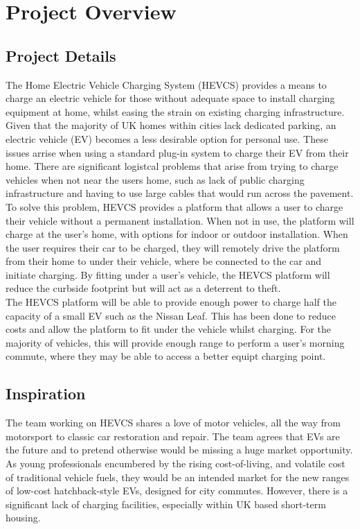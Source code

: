 \documentclass [12pt]{article}
\begin{document}
\section{Project Overview}\label{sec:project_overview}
\subsection{Project Details}\label{sec:project_details}

The Home Electric Vehicle Charging System (HEVCS) provides a means to charge an electric vehicle for those without adequate space to install charging equipment at home, whilst easing the strain on existing charging infrastructure.
Given that the majority of UK homes within cities lack dedicated parking, an electric vehicle (EV) becomes a less desirable option for personal use.
These issues arrise when using a standard plug-in system to charge their EV from their home.
There are significant logistcal problems that arise from trying to charge vehicles when not near the users home, such as lack of public charging infrastructure and having to use large cables that would run across the pavement.
\\
To solve this problem, HEVCS provides a platform that allows a user to charge their vehicle without a permanent installation.
When not in use, the platform will charge at the user's home, with options for indoor or outdoor installation.
When the user requires their car to be charged, they will remotely drive the platform from their home to under their vehicle, where be connected to the car and initiate charging.
By fitting under a user's vehicle, the HEVCS platform will reduce the curbside footprint but will act as a deterrent to theft.
\\
The HEVCS platform will be able to provide enough power to charge half the capacity of a small EV such as the Nissan Leaf.
This has been done to reduce costs and allow the platform to fit under the vehicle whilst charging.
For the majority of vehicles, this will provide enough range to perform a user's morning commute, where they may be able to access a better equipt charging point.

\subsection{Inspiration}\label{sec:inspiration}

The team working on HEVCS shares a love of motor vehicles, all the way from motorsport to classic car restoration and repair.
The team agrees that EVs are the future and to pretend otherwise would be missing a huge market opportunity.
As young professionals encumbered by the rising cost-of-living, and volatile cost of traditional vehicle fuels, they would be an intended market for the new ranges of low-cost hatchback-style EVs, designed for city commutes.
However, there is a significant lack of charging facilities, especially within UK based short-term housing.
\end{document}
